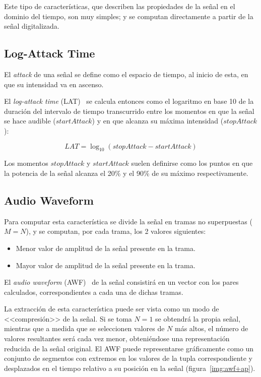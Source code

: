 Este tipo de características, que describen las propiedades de la señal en el dominio del tiempo, son muy simples;
y se computan directamente a partir de la señal digitalizada.

\subsection{Log-Attack Time}\label{subsec:log-attackTime}

El \textit{attack} de una señal se define como el espacio de tiempo, al inicio de esta, en que su intensidad va en ascenso.

El \textit{log-attack time} (LAT)~\cite{Kim05,Manjunath02,Peters04,Gunasekaran11} se calcula entonces como el logaritmo en base 10 de la duración del intervalo de tiempo transcurrido entre los momentos en que la señal se hace audible ($startAttack$) y en que alcanza su máxima intensidad ($stopAttack$):

\begin{equation}
    \label{eq:LAT}
    LAT = \log_{10}{(stopAttack - startAttack)}
\end{equation}

Los momentos $stopAttack$ y $startAttack$ suelen definirse como los puntos en que la potencia de la señal alcanza el 20\% y el 90\% de su máximo respectivamente.

\subsection{Audio Waveform}\label{subsec:audioWaveform}

Para computar esta característica se divide la señal en tramas no superpuestas ($M = N$), y se computan, por cada trama, los 2 valores siguientes:

\begin{itemize}
    \item Menor valor de amplitud de la señal presente en la trama.
    \item Mayor valor de amplitud de la señal presente en la trama.
\end{itemize}

El \textit{audio waveform} (AWF)~\cite{Kim05,Manjunath02} de la señal consistirá en un vector con los pares calculados, correspondientes a cada una de dichas tramas.

La extracción de esta característica puede ser vista como un modo de <<compresión>> de la señal.
Si se toma $N=1$ se obtendrá la propia señal, mientras que a medida que se seleccionen valores de $N$ más altos, el número de valores resultantes será cada vez menor, obteniéndose una representación reducida de la señal original.
El AWF puede representarse gráficamente como un conjunto de segmentos con extremos en los valores de la tupla correspondiente y desplazados en el tiempo relativo a su posición en la señal (figura~\ref{img:awf+ap}).

